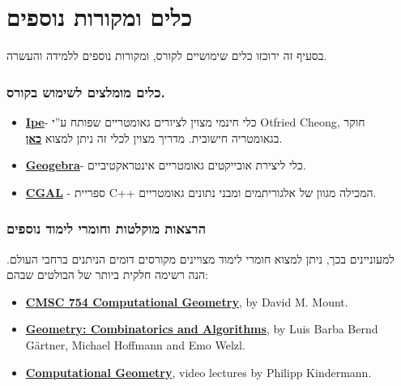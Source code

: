 \documentclass[
]{book}
\providecommand{\tightlist}{%
  \setlength{\itemsep}{0pt}\setlength{\parskip}{0pt}}
\begin{document}
\hypertarget{more-tools}{%
\section{כלים ומקורות נוספים}\label{more-tools}}

בסעיף זה ירוכזו כלים שימושיים לקורס, ומקורות נוספים ללמידה והעשרה.

\hypertarget{ux5dbux5dcux5d9ux5dd-ux5deux5d5ux5deux5dcux5e6ux5d9ux5dd-ux5dcux5e9ux5d9ux5deux5d5ux5e9-ux5d1ux5e7ux5d5ux5e8ux5e1.}{%
\subsubsection*{כלים מומלצים לשימוש בקורס.}\label{ux5dbux5dcux5d9ux5dd-ux5deux5d5ux5deux5dcux5e6ux5d9ux5dd-ux5dcux5e9ux5d9ux5deux5d5ux5e9-ux5d1ux5e7ux5d5ux5e8ux5e1.}}

\begin{itemize}
\tightlist
\item
  \href{https://ipe.otfried.org/}{\textbf{Ipe}}- כלי חינמי מצוין לציורים גאומטריים שפותח ע''י Otfried Cheong, חוקר בגאומטריה חישובית. מדריך מצוין לכלי זה ניתן למצוא \href{https://www.youtube.com/watch?v=moM4CATxTgw\&ab_channel=V\%C3\%A1clavBla\%C5\%BEej}{\textbf{כאן}}.
\item
  \href{https://www.geogebra.org/geometry}{\textbf{Geogebra}}- כלי ליצירת אובייקטים גאומטריים אינטראקטיביים.
\item
  \href{https://www.cgal.org/}{\textbf{CGAL}} - ספריית C++ המכילה מגוון של אלגוריתמים ומבני נתונים גאומטריים.
\end{itemize}

\hypertarget{ux5d4ux5e8ux5e6ux5d0ux5d5ux5ea-ux5deux5d5ux5e7ux5dcux5d8ux5d5ux5ea-ux5d5ux5d7ux5d5ux5deux5e8ux5d9-ux5dcux5d9ux5deux5d5ux5d3-ux5e0ux5d5ux5e1ux5e4ux5d9ux5dd}{%
\subsubsection*{הרצאות מוקלטות וחומרי לימוד נוספים}\label{ux5d4ux5e8ux5e6ux5d0ux5d5ux5ea-ux5deux5d5ux5e7ux5dcux5d8ux5d5ux5ea-ux5d5ux5d7ux5d5ux5deux5e8ux5d9-ux5dcux5d9ux5deux5d5ux5d3-ux5e0ux5d5ux5e1ux5e4ux5d9ux5dd}}

למעוניינים בכך, ניתן למצוא חומרי לימוד מצויינים מקורסים דומים הניתנים ברחבי העולם. הנה רשימה חלקית ביותר של הבולטים שבהם:

\begin{itemize}
\tightlist
\item
  \href{http://www.cs.umd.edu/class/spring2020/cmsc754/Lects/cmsc754-spring2020-lects.pdf}{\textbf{CMSC 754 Computational Geometry}}, by David M. Mount.
\item
  \href{https://geometry.inf.ethz.ch/gca18.pdf}{\textbf{Geometry: Combinatorics and Algorithms}}, by Luis Barba Bernd Gärtner, Michael Hoffmann and Emo Welzl.
\item
  \href{https://www.youtube.com/@PhilippKindermann/playlists?view=50\&sort=dd\&shelf_id=2}{\textbf{Computational Geometry}}, video lectures by Philipp Kindermann.
\end{itemize}
\end{document}
